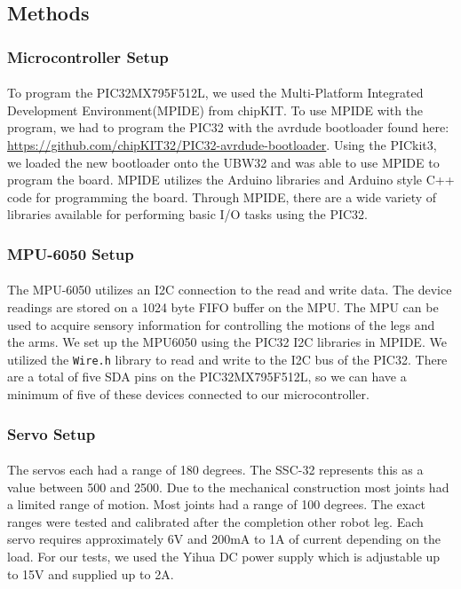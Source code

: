 \documentclass[titlepage,letterpaper,12pt]{article}
\begin{document}
\subsection{Methods}
\subsubsection{Microcontroller Setup}
\paragraph{}To program the PIC32MX795F512L, we used the Multi-Platform
Integrated Development Environment(MPIDE) from chipKIT. To use MPIDE
with the program, we had to program the PIC32 with the avrdude bootloader found
here: \url{https://github.com/chipKIT32/PIC32-avrdude-bootloader}. Using the
PICkit3, we loaded the new bootloader onto the UBW32 and was able to use MPIDE
to program the board. MPIDE utilizes the Arduino libraries and Arduino style C++
code for programming the board. Through MPIDE, there are a wide variety of
libraries available for performing basic I/O tasks using the PIC32.

\subsubsection{MPU-6050 Setup}
\paragraph{}The MPU-6050 utilizes an I2C connection to the read and write data.
The device readings are stored on a 1024 byte FIFO buffer on the
MPU\cite{mpu6050data}. The MPU can be used to acquire sensory information for
controlling the motions of the legs and the arms. We set up the MPU6050 using
the PIC32 I2C libraries in MPIDE. We utilized the \verb!Wire.h! library to read
and write to the I2C bus of the PIC32\cite{Krodal2013}. There are a total of
five SDA pins on the PIC32MX795F512L, so we can have a minimum of five of these
devices connected to our microcontroller.

\subsubsection{Servo Setup}
\paragraph{}The servos each had a range of 180 degrees. The SSC-32 represents
this as a value between 500 and 2500. Due to the mechanical construction most
joints had a limited range of motion. Most joints had a range of 100 degrees.
The exact ranges were tested and calibrated after the completion other robot
leg. Each servo requires approximately 6V and 200mA to 1A of current depending
on the load\cite{servodata}. For our tests, we used the Yihua DC power supply
which is adjustable up to 15V and supplied up to 2A\cite{yihuadata}.
\end{document}
